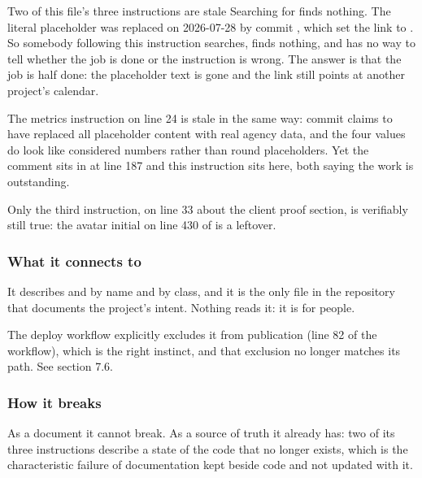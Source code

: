 \begin{honest}{Two of this file's three instructions are stale}
Searching  for  finds nothing. The literal
placeholder was replaced on 2026-07-28 by commit , which set the link
to . So somebody following this instruction searches,
finds nothing, and has no way to tell whether the job is done or the instruction is
wrong. The answer is that the job is half done: the placeholder text is gone and the
link still points at another project's calendar.

The metrics instruction on line 24 is stale in the same way: commit 
claims to have replaced all placeholder content with real agency data, and the four
values do look like considered numbers rather than round placeholders. Yet the
 comment sits in  at line 187 and this instruction sits
here, both saying the work is outstanding.

Only the third instruction, on line 33 about the client proof section, is verifiably
still true: the avatar initial on line 430 of  is a leftover.
\end{honest}

\subsubsection*{What it connects to}

It describes  and
 by name and by class, and it is the only
file in the repository that documents the project's intent. Nothing reads it: it is
for people.

The deploy workflow explicitly excludes it from publication (line 82 of the
workflow), which is the right instinct, and that exclusion no longer matches its
path. See section 7.6.

\subsubsection*{How it breaks}

As a document it cannot break. As a source of truth it already has: two of its
three instructions describe a state of the code that no longer exists, which is the
characteristic failure of documentation kept beside code and not updated with it.

